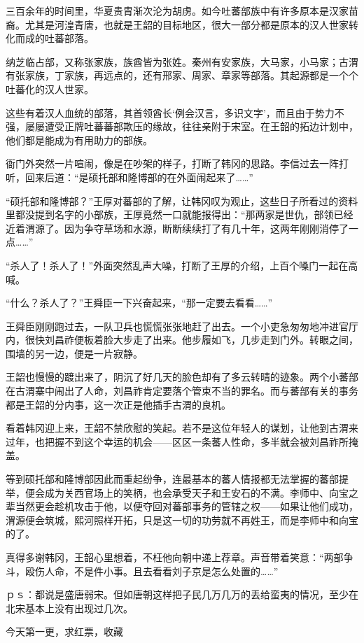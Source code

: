 三百余年的时间里，华夏贵胄渐次沦为胡虏。如今吐蕃部族中有许多原本是汉家苗裔。尤其是河湟青唐，也就是王韶的目标地区，很大一部分都是原本的汉人世家转化而成的吐蕃部落。

纳芝临占部，又称张家族，族酋皆为张姓。秦州有安家族，大马家，小马家；古渭有张家族，丁家族，再远点的，还有邢家、周家、章家等部落。其起源都是一个个吐蕃化的汉人世家。

这些有着汉人血统的部落，其首领酋长‘例会汉言，多识文字’，而且由于势力不强，屡屡遭受正牌吐蕃蕃部欺压的缘故，往往亲附于宋室。在王韶的拓边计划中，他们都是能成为有用助力的部族。

衙门外突然一片喧闹，像是在吵架的样子，打断了韩冈的思路。李信过去一阵打听，回来后道：“是硕托部和隆博部的在外面闹起来了……”

“硕托部和隆博部？”王厚对蕃部的了解，让韩冈叹为观止，这些日子所看过的资料里都没提到名字的小部族，王厚竟然一口就能报得出：“那两家是世仇，部领已经近着渭源了。因为争夺草场和水源，断断续续打了有几十年，这两年刚刚消停了一点……”

“杀人了！杀人了！”外面突然乱声大噪，打断了王厚的介绍，上百个嗓门一起在高喊。

“什么？杀人了？”王舜臣一下兴奋起来，“那一定要去看看……”

王舜臣刚刚跑过去，一队卫兵也慌慌张张地赶了出去。一个小吏急匆匆地冲进官厅内，很快刘昌祚便板着脸大步走了出来。他步履如飞，几步走到门外。转眼之间，围墙的另一边，便是一片寂静。

王韶也慢慢的踱出来了，阴沉了好几天的脸色却有了多云转晴的迹象。两个小蕃部在古渭寨中闹出了人命，刘昌祚肯定要落个管束不当的罪名。而与蕃部有关的事务都是王韶的分内事，这一次正是他插手古渭的良机。

看着韩冈迎上来，王韶不禁欣慰的笑起。若不是这位年轻人的谋划，让他到古渭来过年，也把握不到这个幸运的机会——区区一条蕃人性命，多半就会被刘昌祚所掩盖。

等到硕托部和隆博部因此而重起纷争，连最基本的蕃人情报都无法掌握的蕃部提举，便会成为关西官场上的笑柄，也会承受天子和王安石的不满。李师中、向宝之辈当然更会趁机攻击于他，以便夺回对蕃部事务的管辖之权——如果让他们成功，渭源便会筑城，熙河照样开拓，只是这一切的功劳就不再姓王，而是李师中和向宝的了。

真得多谢韩冈，王韶心里想着，不枉他向朝中递上荐章。声音带着笑意：“两部争斗，殴伤人命，不是件小事。且去看看刘子京是怎么处置的……”

ｐｓ：都说是盛唐弱宋。但如唐朝这样把子民几万几万的丢给蛮夷的情况，至少在北宋基本上没有出现过几次。

今天第一更，求红票，收藏

